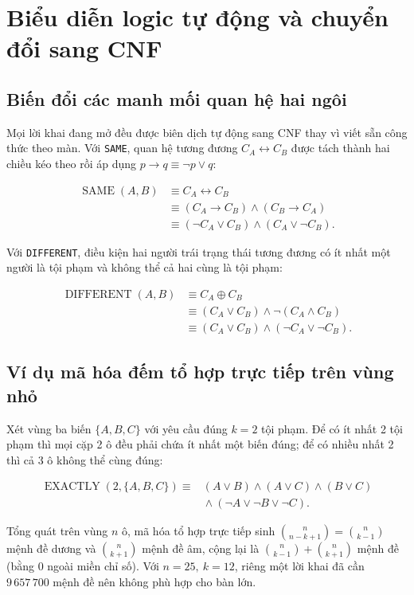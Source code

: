 \section{Biểu diễn logic tự động và chuyển đổi sang CNF}

\subsection{Biến đổi các manh mối quan hệ hai ngôi}

Mọi lời khai đang mở đều được biên dịch tự động sang CNF thay vì viết sẵn công thức theo màn. Với \texttt{SAME}, quan hệ tương đương $C_A\leftrightarrow C_B$ được tách thành hai chiều kéo theo rồi áp dụng $p\to q\equiv \neg p\lor q$:

\[
\begin{aligned}
\operatorname{SAME}(A,B)&\equiv C_A\leftrightarrow C_B\\
&\equiv(C_A\to C_B)\land(C_B\to C_A)\\
&\equiv(\neg C_A\lor C_B)\land(C_A\lor\neg C_B).
\end{aligned}
\]

Với \texttt{DIFFERENT}, điều kiện hai người trái trạng thái tương đương có ít nhất một người là tội phạm và không thể cả hai cùng là tội phạm:

\[
\begin{aligned}
\operatorname{DIFFERENT}(A,B)&\equiv C_A\oplus C_B\\
&\equiv (C_A\lor C_B)\land\neg(C_A\land C_B)\\
&\equiv (C_A\lor C_B)\land(\neg C_A\lor\neg C_B).
\end{aligned}
\]

\subsection{Ví dụ mã hóa đếm tổ hợp trực tiếp trên vùng nhỏ}

Xét vùng ba biến $\{A,B,C\}$ với yêu cầu đúng $k=2$ tội phạm. Để có ít nhất 2 tội phạm thì mọi cặp 2 ô đều phải chứa ít nhất một biến đúng; để có nhiều nhất 2 thì cả 3 ô không thể cùng đúng:

\[
\begin{aligned}
\operatorname{EXACTLY}(2,\{A,B,C\})\equiv{}&
(A\lor B)\land(A\lor C)\land(B\lor C)\\
&{}\land(\neg A\lor\neg B\lor\neg C).
\end{aligned}
\]

Tổng quát trên vùng $n$ ô, mã hóa tổ hợp trực tiếp sinh $\binom{n}{n-k+1}=\binom{n}{k-1}$ mệnh đề dương và $\binom{n}{k+1}$ mệnh đề âm, cộng lại là $\binom{n}{k-1}+\binom{n}{k+1}$ mệnh đề (bằng 0 ngoài miền chỉ số). Với $n=25,\ k=12$, riêng một lời khai đã cần $9\,657\,700$ mệnh đề nên không phù hợp cho bàn lớn.

